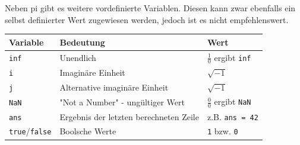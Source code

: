 \documentclass[12pt, a4paper, twoside]{article}
\begin{document}
                \noindent Neben pi gibt es weitere vordefinierte Variablen. Diesen kann zwar ebenfalls ein selbst definierter Wert zugewiesen werden, jedoch ist es nicht empfehlenswert.
                \begin{center}
                \renewcommand{\arraystretch}{1.4}
                \begin{tabularx}{\textwidth}{|l| X| l|}
                    \hline
                    \textbf{Variable} & \textbf{Bedeutung} & \textbf{Wert} \\
                    \hline
                    \texttt{inf} & Unendlich & $\frac{1}{0}$ ergibt \texttt{inf} \\
                    \hline
                    \texttt{i} & Imaginäre Einheit & $\sqrt{-1}$ \\
                    \hline
                    \texttt{j} & Alternative imaginäre Einheit & $\sqrt{-1}$ \\
                    \hline
                    \texttt{NaN} & "Not a Number" - ungültiger Wert & $\frac{0}{0}$ ergibt \texttt{NaN} \\
                    \hline
                    \texttt{ans} & Ergebnis der letzten berechneten Zeile & z.B. \texttt{ans = 42} \\
                    \hline
                    \texttt{true}/\texttt{false} & Boolsche Werte & \texttt{1} bzw. \texttt{0} \\
                    \hline
                \end{tabularx}
            \end{center}
\end{document}
